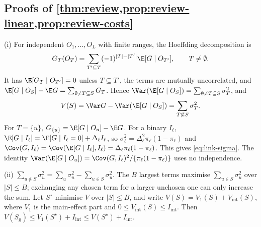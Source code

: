 \subsection{Proofs of \texorpdfstring{\cref{thm:review,prop:review-linear,prop:review-costs}}{the review results}}\label{app:link-review}

(i) For independent $O_1,\dots,O_L$ with finite ranges, the Hoeffding decomposition \citep{hoeffding1948,efron1981} is
\[
  G_T(O_T)=\sum_{T'\subseteq T}(-1)^{|T|-|T'|}\E[G\mid O_{T'}],\qquad T\ne\emptyset .
\]
It has $\E[G_T\mid O_{T'}]=0$ unless $T\subseteq T'$, the terms are mutually uncorrelated, and $\E[G\mid O_S]-\E G=\sum_{\emptyset\ne T\subseteq S}G_T$. Hence $\Var(\E[G\mid O_S])=\sum_{\emptyset\ne T\subseteq S}\sigma_T^2$, and
\[
  V(S)=\Var G-\Var(\E[G\mid O_S])=\sum_{T\not\subseteq S}\sigma_T^2 .
\]
For $T=\{u\}$, $G_{\{u\}}=\E[G\mid O_u]-\E G$. For a binary $I_\ell$, $\E[G\mid I_\ell]=\E[G\mid I_\ell=0]+\Delta_\ell I_\ell$, so $\sigma_\ell^2=\Delta_\ell^2\pi_\ell(1-\pi_\ell)$ and $\Cov(G,I_\ell)=\Cov(\E[G\mid I_\ell],I_\ell)=\Delta_\ell\pi_\ell(1-\pi_\ell)$. This gives \eqref{eq:link-sigma}. The identity $\Var(\E[G\mid O_u])=\Cov(G,I_\ell)^2/\{\pi_\ell(1-\pi_\ell)\}$ uses no independence.

(ii) $\sum_{u\notin S}\sigma_u^2=\sum_u\sigma_u^2-\sum_{u\in S}\sigma_u^2$. The $B$ largest terms maximise $\sum_{u\in S}\sigma_u^2$ over $|S|\le B$; exchanging any chosen term for a larger unchosen one can only increase the sum. Let $S^\star$ minimise $V$ over $|S|\le B$, and write $V(S)=V_1(S)+V_{\mathrm{int}}(S)$, where $V_1$ is the main-effect part and $0\le V_{\mathrm{int}}(S)\le I_{\mathrm{int}}$. Then $V(S_{\mathrm g})\le V_1(S^\star)+I_{\mathrm{int}}\le V(S^\star)+I_{\mathrm{int}}$.

